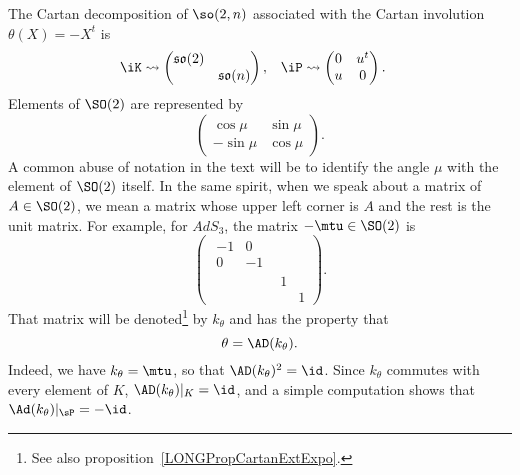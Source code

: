 The Cartan decomposition of $\so(2,n)$ associated with the Cartan involution $\theta(X)=-X^t$ is
\begin{align}\label{K_et_P}
	\iK & \leadsto
	\begin{pmatrix}
		\mathfrak{so}(2)    \\
		 & \mathfrak{so}(n)
	\end{pmatrix},
	    & \iP      & \leadsto\begin{pmatrix}
		                         0 & u^t \\
		                         u & 0
	                         \end{pmatrix}.
\end{align}
Elements of $\SO(2)$ are represented by
\[
	\begin{pmatrix}
		\cos\mu  & \sin\mu \\
		-\sin\mu & \cos\mu
	\end{pmatrix}.
\]
A common abuse of notation in the text will be to identify the angle $\mu$ with the element of $\SO(2)$ itself. In the same spirit, when we speak about a matrix of $A\in \SO(2)$, we mean a matrix whose upper left corner is $A$ and the rest is the unit matrix. For example, for $AdS_3$, the matrix $-\mtu\in \SO(2)$ is
\[
	\begin{pmatrix}
		\begin{matrix}
			-1 & 0  \\
			0  & -1
		\end{matrix} \\
		 & 1          \\
		 &   & 1
	\end{pmatrix}.
\]
That matrix will be denoted\footnote{See also proposition~\ref{LONGPropCartanExtExpo}.} by $k_{\theta}$ and has the property that
\begin{equation}
	\theta=\AD(k_{\theta}).
\end{equation}
Indeed, we have $k_{\theta}=\mtu$, so that $\AD(k_{\theta})^2=\id$. Since $k_{\theta}$ commutes with every element of $K$, $\AD(k_{\theta})|_{K}=\id$, and a simple computation shows that $\Ad(k_{\theta})|_{\sP}=-\id$.

